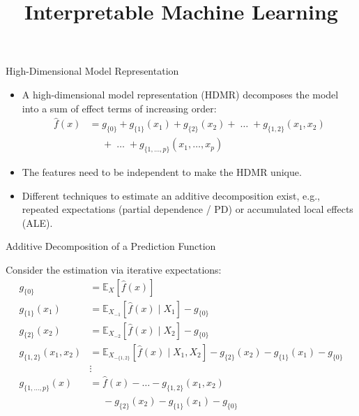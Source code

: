 \documentclass[11pt,compress,t,notes=noshow, xcolor=table]{beamer}
\title{Interpretable Machine Learning}
\institute{\href{https://compstat-lmu.github.io/lecture_iml/}{compstat-lmu.github.io/lecture\_iml}}
\date{}
\begin{document}


\newcommand{\titlefigure}{figure/open_blackbox}
\newcommand{\learninggoals}{
\item Interpretable Models}

 
\begin{vbframe}{High-Dimensional Model Representation}

\begin{itemize}
\item
A high-dimensional model representation (HDMR) decomposes the model into a sum of effect terms of increasing order:
\begin{align*}
\hat{f}(x) &= g_{\{0\}} + g_{\{1\}}(x_1) + g_{\{2\}}(x_2) + \;\dots\; + g_{\{1, 2\}}(x_1, x_2) \\
&\phantom{{}={}} + \;\dots\; + g_{\{1,\ldots,p\}}(x_1, \ldots,x_p)
\end{align*}
\item The features need to be independent to make the HDMR unique.
\item Different techniques to estimate an additive decomposition exist, e.g., repeated expectations (partial dependence / PD) or accumulated local effects (ALE).

\end{itemize}
\end{vbframe}

\begin{vbframe}{Additive Decomposition of a Prediction Function}

Consider the estimation via iterative expectations:
\begin{align*}
 g_{\{0\}} &= \mathbb{E}_X\left[\widehat{f}(x)\right] \\
 g_{\{1\}}(x_1) &= \mathbb{E}_{X_{-1}}\left[\widehat{f}(x) \; \vert  \; X_1 \right] - g_{\{0\}} \\
 g_{\{2\}}(x_2) &= \mathbb{E}_{X_{-2}}\left[\widehat{f}(x) \; \vert  \; X_2 \right] - g_{\{0\}} \\
 g_{\{1, 2\}}(x_1, x_2) &= \mathbb{E}_{X_{-\{1,2\}}}\left[\widehat{f}(x) \; \vert \; X_1, X_2 \right] - g_{\{2\}}(x_2) - g_{\{1\}}(x_1) - g_{\{0\}}\\
 &\vdots \\
 g_{\{1, \dots, p\}}(x) &= \widehat{f}(x) - \dots - g_{\{1, 2\}}(x_1, x_2) \\
 &\phantom{{}={}} - g_{\{2\}}(x_2) - g_{\{1\}}(x_1) - g_{\{0\}}\\
\end{align*}

\end{vbframe}
\end{document}
